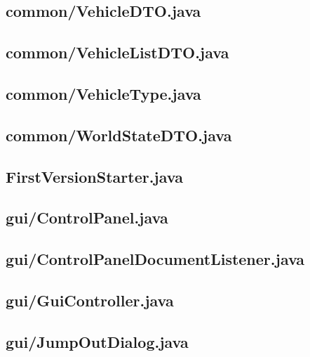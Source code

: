 \subsection{common/VehicleDTO.java}

\newpage
\subsection{common/VehicleListDTO.java}

\newpage
\subsection{common/VehicleType.java}

\newpage
\subsection{common/WorldStateDTO.java}

\newpage
\subsection{FirstVersionStarter.java}

\newpage
\subsection{gui/ControlPanel.java}

\newpage
\subsection{gui/ControlPanelDocumentListener.java}

\newpage
\subsection{gui/GuiController.java}

\newpage
\subsection{gui/JumpOutDialog.java}

\newpage
